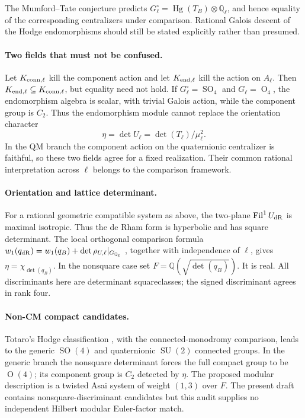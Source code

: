 \documentclass[11pt]{article}
\newcommand{\Q}{\mathbb Q}
\DeclareMathOperator{\SO}{SO}
\DeclareMathOperator{\SU}{SU}
\begin{document}
The Mumford--Tate conjecture predicts
$G_\ell^\circ=\operatorname{Hg}(T_B)\otimes\Q_\ell$, and hence equality of the
corresponding centralizers under comparison. Rational Galois descent of the
Hodge endomorphisms should still be stated explicitly rather than presumed.

\paragraph{Two fields that must not be confused.}
Let $K_{\rm conn,\ell}$ kill the component action and let $K_{\rm end,\ell}$
kill the action on $A_\ell$. Then
$K_{\rm end,\ell}\subseteq K_{\rm conn,\ell}$, but equality need not hold.
If $G_\ell^\circ=\SO_4$ and $G_\ell=\operatorname O_4$, the endomorphism
algebra is scalar, with trivial Galois action, while the component group is $C_2$.
Thus the endomorphism module cannot replace the orientation character
\[
 \eta=\det U_\ell=\det(T_\ell)/\mu_\ell^2.
\]
In the QM branch the component action on the quaternionic centralizer is
faithful, so these two fields agree for a fixed realization. Their common
rational interpretation across $\ell$ belongs to the comparison framework.

\paragraph{Orientation and lattice determinant.}
For a rational geometric compatible system as above, the two-plane
$\operatorname{Fil}^1 U_{\rm dR}$ is maximal isotropic. Thus the de Rham form is
hyperbolic and has square determinant. The local orthogonal comparison formula
$w_1(q_{\rm dR})=w_1(q_B)+\det\rho_{U,\ell}|_{G_{\Q_\ell}}$
\cite[Theorem 1.3]{cnm}, together with independence of $\ell$, gives
$\eta=\chi_{\det(q_B)}$. In the nonsquare case set
$F=\Q(\sqrt{\det(q_B)})$. It is real. All discriminants here are determinant
squareclasses; the signed discriminant agrees in rank four.

\paragraph{Non-CM compact candidates.}
Totaro's Hodge classification \cite{totaro}, with the connected-monodromy
comparison, leads to the generic $\SO(4)$ and quaternionic $\SU(2)$ connected
groups. In the generic branch the nonsquare determinant forces the full compact
group to be $\operatorname O(4)$; its component group is $C_2$ detected by $\eta$.
The proposed modular description is a twisted Asai system of weight $(1,3)$
over $F$. The present draft contains nonsquare-discriminant candidates but this
audit supplies no independent Hilbert modular Euler-factor match.
\end{document}
